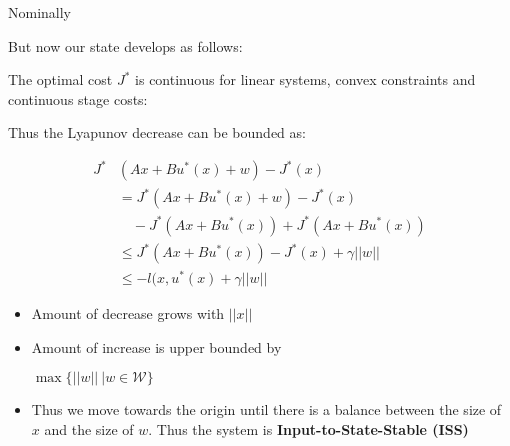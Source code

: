 \documentclass[8pt,a4paper]{scrartcl}
\begin{document}
\begin{multicols*}{3}
\begin{multicols*}{4}
Nominally


But now our state develops as follows:


The optimal cost $J^\ast$ is continuous for linear systems, convex constraints and continuous stage costs:


Thus the Lyapunov decrease can be bounded as:

\begin{align*}
J^\ast&(Ax+Bu^\ast(x)+w)-J^\ast(x)\\
&=J^\ast(Ax+Bu^\ast(x)+w)-J^\ast(x)\\
&\quad-J^\ast(Ax+Bu^\ast(x))+J^\ast(Ax+Bu^\ast(x))\\
&\leq J^\ast(Ax+Bu^\ast(x))-J^\ast(x)+\gamma||w||\\
&\leq -l(x,u^\ast(x)+\gamma||w||
\end{align*}

\begin{itemize}
\item Amount of decrease grows with $||x||$
\item Amount of increase is upper bounded by 

$\max\{||w||\ |w\in\mathcal{W}\}$
\item Thus we move towards the origin until there is a balance between the size of $x$ and the size of $w$. Thus the system is \textbf{Input-to-State-Stable (ISS)}
\end{itemize}


\end{multicols*}
\end{multicols*}
\end{document}
